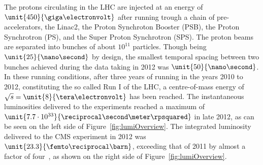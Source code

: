The protons circulating in the LHC are injected at an energy of $\unit{450}{\giga\electronvolt}$ after running trough a chain of pre-accelerators, the Linac2, the Proton Synchroton Booster (PSB), the Proton Synchrotron (PS), and the Super Proton Synchrotron (SPS). The proton beams are separated into bunches of about $10^{11}$ particles. Though being $\unit{25}{\nano\second}$ by design, the smallest temporal spacing between two bunches achieved during the data taking in 2012 was $\unit{50}{\nano\second}$. In these running conditions, after three years of running in the years 2010 to 2012, constituting the so called Run I of the LHC, a centre-of-mass energy of $\sqrt{s} = \unit{8}{\tera\electronvolt}$ has been reached. The instantaneous luminosities delivered to the experiments reached a maximum of $\unit{7.7\cdot 10^{33}}{\reciprocal\second\meter\rpsquared}$ in late 2012, as can be seen on the left side of Figure~\ref{fig:lumiOverview}. The integrated luminosity delivered to the CMS experiment in 2012 was $\unit{23.3}{\femto\reciprocal\barn}$, exceeding that of 2011 by almost a factor of four~\cite{LumiTwiki}, as shown on the right side of Figure~\ref{fig:lumiOverview}. 

